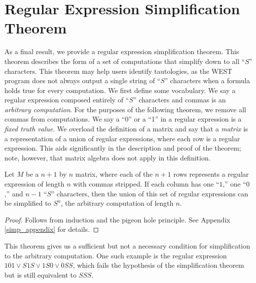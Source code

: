 \documentclass[runningheads]{llncs}
\begin{document}
\section{Regular Expression Simplification Theorem} \label{simpsection}
As a final result, we provide a regular expression simplification theorem. This theorem describes the form of a set of computations that simplify down to all ``$S$'' characters. This theorem may help users identify tautologies, as the WEST program does not always output a single string of ``$S$'' characters when a formula holds true for every computation. We first define some vocabulary.
 We say a regular expression composed entirely of ``$S$'' characters and commas is an \emph{arbitrary computation}. For the purposes of the following theorem, we remove all commas from computations. We say a ``0'' or a ``1'' in a regular expression is a \emph{fixed truth value}. We overload the definition of a matrix and say that a \emph{matrix} is a representation of a union of regular expressions, where each row is a regular expression. This aids significantly in the description and proof of the theorem; note, however, that matrix algebra does not apply in this definition.

\begin{theorem} \label{simp}
Let $M$ be a $n+1$ by $n$ matrix, where each of the $n+1$ rows represents a regular expression of length $n$ with commas stripped. If each column has one ``$1$,'' one ``$0$,'' and $n-1$ ``$S$'' characters, then the union of this set of regular expressions can be simplified to $S^n$, the arbitrary computation of length $n$.
\end{theorem}
\begin{proof}
    Follows from induction and the pigeon hole principle. See Appendix \ref{simp_appendix} for details.
\end{proof}
This theorem gives us a sufficient but not a necessary condition for simplification to the arbitrary computation. One such example is the regular expression $101 \lor S1S \lor 1S0 \lor 0SS$, which fails the hypothesis of the  simplification theorem but is still equivalent to $SSS$.
\end{document}
